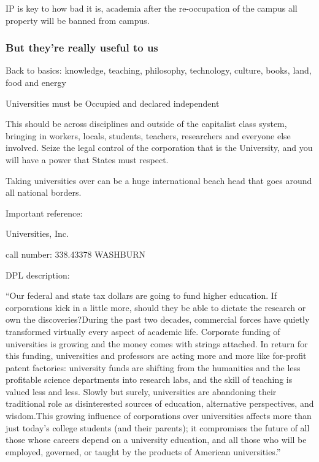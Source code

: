 IP is key to how bad it is, academia after the re-occupation of the
campus all property will be banned from campus.

\subsubsection{But they're really useful to
us}\label{but-theyre-really-useful-to-us}

Back to basics: knowledge, teaching, philosophy, technology, culture,
books, land, food and energy

Universities must be Occupied and declared independent

This should be across disciplines and outside of the capitalist class
system, bringing in workers, locals, students, teachers, researchers and
everyone else involved. Seize the legal control of the corporation that
is the University, and you will have a power that States must respect.

Taking universities over can be a huge international beach head that
goes around all national borders.

Important reference:

Universities, Inc.

call number: 338.43378 WASHBURN

DPL description:

``Our federal and state tax dollars are going to fund higher education.
If corporations kick in a little more, should they be able to dictate
the research or own the discoveries?During the past two decades,
commercial forces have quietly transformed virtually every aspect of
academic life. Corporate funding of universities is growing and the
money comes with strings attached. In return for this funding,
universities and professors are acting more and more like for-profit
patent factories: university funds are shifting from the humanities and
the less profitable science departments into research labs, and the
skill of teaching is valued less and less. Slowly but surely,
universities are abandoning their traditional role as disinterested
sources of education, alternative perspectives, and wisdom.This growing
influence of corporations over universities affects more than just
today's college students (and their parents); it compromises the future
of all those whose careers depend on a university education, and all
those who will be employed, governed, or taught by the products of
American universities.''
